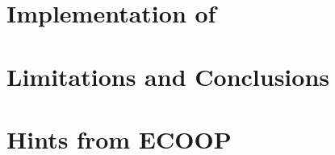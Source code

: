 \documentclass[nonatbib,preprint,numbers]{sigplanconf}
\begin{document}
\section{Implementation of \Fajita}
\label{section:implementation}


\section{Limitations and Conclusions}
\label{section:zz}


\small


\clearpage
\appendix
\section{Hints from ECOOP}
\label{section:ecoop}

\end{document}

